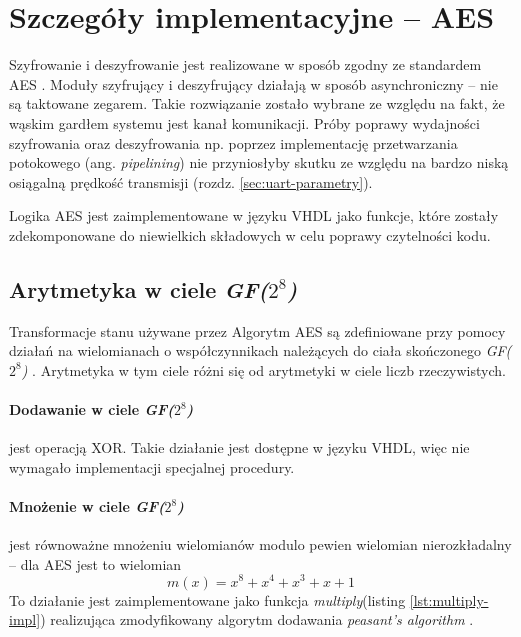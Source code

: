\section{Szczegóły implementacyjne -- AES}
\label{sec:szczegoly-implementacyjne-aes}
Szyfrowanie i deszyfrowanie jest realizowane w sposób zgodny ze standardem AES \cite{aes-standard}. Moduły szyfrujący i deszyfrujący działają w sposób asynchroniczny -- nie są taktowane zegarem. Takie rozwiązanie zostało wybrane ze względu na fakt, że wąskim gardłem systemu jest kanał komunikacji. Próby poprawy wydajności szyfrowania oraz deszyfrowania np. poprzez implementację przetwarzania potokowego (ang. \textit{pipelining}) nie przyniosłyby skutku ze względu na bardzo niską osiągalną prędkość transmisji (rozdz. \ref{sec:uart-parametry}).

Logika AES jest zaimplementowane w języku VHDL jako funkcje, które zostały zdekomponowane do niewielkich składowych w celu poprawy czytelności kodu.

\subsection{Arytmetyka w ciele \textit{GF($2^8$)}}
\label{sec:arytmetyka}
Transformacje stanu używane przez Algorytm AES są zdefiniowane przy pomocy działań na wielomianach o współczynnikach należących do ciała skończonego \textit{GF($2^8$)} \cite[rozdz. 4.3]{aes-standard}. Arytmetyka w tym ciele różni się od arytmetyki w ciele liczb rzeczywistych.

\paragraph{Dodawanie w ciele \textit{GF($2^8$)}} \cite[rozdz. 4.1]{aes-standard} jest operacją XOR. Takie działanie jest dostępne w języku VHDL, więc nie wymagało implementacji specjalnej procedury.

\paragraph{Mnożenie w ciele \textit{GF($2^8$)}} \cite[rozdz. 4.2]{aes-standard} jest równoważne mnożeniu wielomianów modulo pewien wielomian nierozkładalny -- dla AES jest to wielomian
\begin{equation*}
m(x) = x^8 + x^4 + x^3 + x + 1
\end{equation*}
To działanie jest zaimplementowane jako funkcja \textit{multiply}(listing \ref{lst:multiply-impl}) realizująca zmodyfikowany algorytm dodawania \textit{peasant's algorithm} \cite{multiply-algo}.

